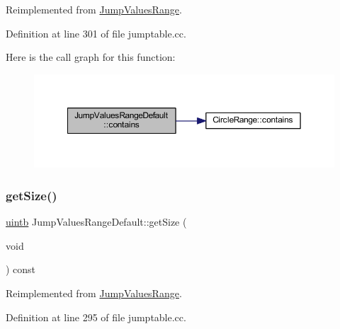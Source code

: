 Reimplemented from \mbox{\hyperlink{class_jump_values_range_ac498609bd6eb43a1b7d1d5bc3ad2152b}{Jump\+Values\+Range}}.



Definition at line 301 of file jumptable.\+cc.

Here is the call graph for this function\+:
\nopagebreak
\begin{figure}[H]
\begin{center}
\leavevmode
\includegraphics[width=350pt]{class_jump_values_range_default_a6f7f9429f60a706f419d4c834fdf4943_cgraph}
\end{center}
\end{figure}
\mbox{\label{class_jump_values_range_default_a079bd26853aa52ccac577fd39c1a3e3e}} 
\subsubsection{\texorpdfstring{getSize()}{getSize()}}
{\footnotesize\ttfamily \mbox{\hyperlink{types_8h_a2db313c5d32a12b01d26ac9b3bca178f}{uintb}} Jump\+Values\+Range\+Default\+::get\+Size (\begin{DoxyParamCaption}\item[{void}]{ }\end{DoxyParamCaption}) const\hspace{0.3cm}{\ttfamily [virtual]}}



Reimplemented from \mbox{\hyperlink{class_jump_values_range_aabad0182df2b5178abcb597278a4ec20}{Jump\+Values\+Range}}.



Definition at line 295 of file jumptable.\+cc.

